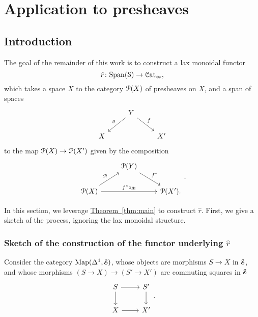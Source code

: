 \documentclass[main.tex]{subfiles}
\begin{document}
\section{Application to presheaves}
\label{sec:application_to_presheaves}

\subsection{Introduction}
\label{ssc:introduction}

The goal of the remainder of this work is to construct a lax monoidal functor
\begin{equation}
  \label{eq:rhat}
  \hat{r}\colon \Span(\S) \to \ICat,
\end{equation}
which takes a space $X$ to the category $\P(X)$ of presheaves on $X$, and a span of spaces
\begin{equation*}
  \begin{tikzcd}
    & Y
    \arrow[dl, swap, "g"]
    \arrow[dr, "f"]
    \\
    X
    && X'
  \end{tikzcd}
\end{equation*}
to the map $\P(X) \to \P(X')$ given by the composition
\begin{equation*}
  \begin{tikzcd}
    & \P(Y)
    \arrow[dr, "f^{*}"]
    \\
    \P(X)
    \arrow[ur, "g_{!}"]
    \arrow[rr, "f^{*} \circ g_{!}"]
    && \P(X').
  \end{tikzcd}.
\end{equation*}

In this section, we leverage \hyperref[thm:main]{Theorem~\ref*{thm:main}} to construct $\hat{r}$. First, we give a sketch of the process, ignoring the lax monoidal structure.

\subsubsection{Sketch of the construction of the functor underlying \texorpdfstring{$\hat{r}$}{r}}
\label{sss:sketch_of_underlying_functor}

Consider the category $\Map(\Delta^{1}, \S)$, whose objects are morphisms $S \to X$ in $\S$, and whose morphisms $(S \to X) \to (S' \to X')$ are commuting squares in $\S$
\begin{equation*}
  \begin{tikzcd}
    S
    \arrow[r]
    \arrow[d]
    & S'
    \arrow[d]
    \\
    X
    \arrow[r]
    & X'
  \end{tikzcd}.
\end{equation*}
\end{document}
